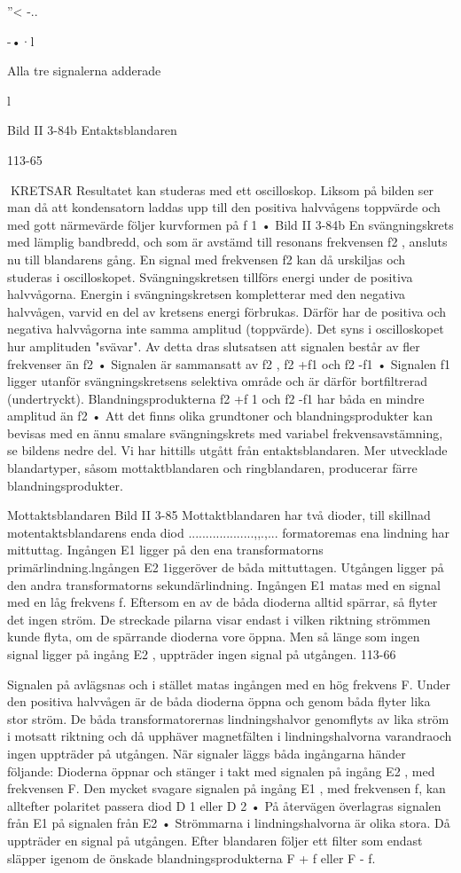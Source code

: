 ''< -..

-•·l

Alla tre signalerna adderade

l

Bild II 3-84b Entaktsblandaren

113-65

KRETSAR
Resultatet kan studeras med ett oscilloskop. Liksom på bilden ser man då att kondensatorn laddas upp till den positiva halvvågens toppvärde och med gott närmevärde
följer kurvformen på f 1 •
Bild II 3-84b
En svängningskrets med lämplig bandbredd, och som är avstämd till resonans
frekvensen f2 , ansluts nu till blandarens
gång. En signal med frekvensen f2 kan då
urskiljas och studeras i oscilloskopet. Svängningskretsen tillförs energi under de positiva
halvvågorna. Energin i svängningskretsen
kompletterar med den negativa halvvågen,
varvid en del av kretsens energi förbrukas.
Därför har de positiva och negativa halvvågorna inte samma amplitud (toppvärde).
Det syns i oscilloskopet hur amplituden
"svävar". Av detta dras slutsatsen att signalen består av fler frekvenser än f2 • Signalen
är sammansatt av f2 , f2 +f1 och f2 -f1 • Signalen
f1 ligger utanför svängningskretsens selektiva område och är därför bortfiltrerad (undertryckt). Blandningsprodukterna f2 +f 1 och f2 -f1
har båda en mindre amplitud än f2 •
Att det finns olika grundtoner och blandningsprodukter kan bevisas med en ännu
smalare svängningskrets med variabel frekvensavstämning, se bildens nedre del.
Vi har hittills utgått från entaktsblandaren.
Mer utvecklade blandartyper, såsom mottaktblandaren och ringblandaren, producerar färre blandningsprodukter.

Mottaktsblandaren
Bild II 3-85
Mottaktblandaren har två dioder, till skillnad
motentaktsblandarens enda diod ...................,,.,...
formatoremas ena lindning har mittuttag.
Ingången E1 ligger på den ena transformatorns primärlindning.lngången E2 1iggeröver
de båda mittuttagen. Utgången ligger på den
andra transformatorns sekundärlindning.
Ingången E1 matas med en signal med
en låg frekvens f. Eftersom en av de båda
dioderna alltid spärrar, så flyter det ingen
ström. De streckade pilarna visar endast i
vilken riktning strömmen kunde flyta, om de
spärrande dioderna vore öppna. Men så
länge som ingen signal ligger på ingång E2 ,
uppträder ingen signal på utgången.
113-66

Signalen på
avlägsnas och i stället
matas ingången
med en hög frekvens F.
Under den positiva halvvågen är de båda
dioderna öppna och genom båda flyter lika
stor ström. De båda transformatorernas
lindningshalvor genomflyts av lika ström i
motsatt riktning och då upphäver magnetfälten i lindningshalvorna varandraoch ingen
uppträder på utgången.
När signaler läggs
båda ingångarna
händer följande:
Dioderna öppnar och stänger i takt med
signalen på ingång E2 , med frekvensen F.
Den mycket svagare signalen på ingång E1 ,
med frekvensen f, kan alltefter polaritet passera diod D 1 eller D 2 • På återvägen överlagras signalen från E1 på signalen från E2 •
Strömmarna i lindningshalvorna är olika
stora. Då uppträder en signal på utgången.
Efter blandaren följer ett filter som endast
släpper igenom de önskade blandningsprodukterna F + f eller F - f.


